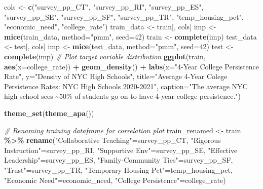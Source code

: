 \documentclass[
  man]{apa6}
\newenvironment{Shaded}{\begin{snugshade}}{\end{snugshade}}
\newcommand{\AttributeTok}[1]{\textcolor[rgb]{0.13,0.29,0.53}{#1}}
\newcommand{\CommentTok}[1]{\textcolor[rgb]{0.56,0.35,0.01}{\textit{#1}}}
\newcommand{\DecValTok}[1]{\textcolor[rgb]{0.00,0.00,0.81}{#1}}
\newcommand{\FunctionTok}[1]{\textcolor[rgb]{0.13,0.29,0.53}{\textbf{#1}}}
\newcommand{\NormalTok}[1]{#1}
\newcommand{\OtherTok}[1]{\textcolor[rgb]{0.56,0.35,0.01}{#1}}
\newcommand{\SpecialCharTok}[1]{\textcolor[rgb]{0.81,0.36,0.00}{\textbf{#1}}}
\newcommand{\StringTok}[1]{\textcolor[rgb]{0.31,0.60,0.02}{#1}}
\begin{document}
\begin{Shaded}
\begin{Highlighting}[]
\NormalTok{cols }\OtherTok{\textless{}{-}} \FunctionTok{c}\NormalTok{(}\StringTok{"survey\_pp\_CT"}\NormalTok{, }\StringTok{"survey\_pp\_RI"}\NormalTok{,}
          \StringTok{"survey\_pp\_ES"}\NormalTok{, }\StringTok{"survey\_pp\_SE"}\NormalTok{,}
          \StringTok{"survey\_pp\_SF"}\NormalTok{, }\StringTok{"survey\_pp\_TR"}\NormalTok{,}
          \StringTok{"temp\_housing\_pct"}\NormalTok{, }\StringTok{"economic\_need"}\NormalTok{,}
          \StringTok{"college\_rate"}\NormalTok{)}
\NormalTok{train\_data }\OtherTok{\textless{}{-}}\NormalTok{ train[, cols]}
\NormalTok{imp }\OtherTok{\textless{}{-}} \FunctionTok{mice}\NormalTok{(train\_data, }\AttributeTok{method=}\StringTok{"pmm"}\NormalTok{, }\AttributeTok{seed=}\DecValTok{42}\NormalTok{)}
\NormalTok{train }\OtherTok{\textless{}{-}} \FunctionTok{complete}\NormalTok{(imp)}
\NormalTok{test\_data }\OtherTok{\textless{}{-}}\NormalTok{ test[, cols]}
\NormalTok{imp }\OtherTok{\textless{}{-}} \FunctionTok{mice}\NormalTok{(test\_data, }\AttributeTok{method=}\StringTok{"pmm"}\NormalTok{, }\AttributeTok{seed=}\DecValTok{42}\NormalTok{)}
\NormalTok{test }\OtherTok{\textless{}{-}} \FunctionTok{complete}\NormalTok{(imp)}
\CommentTok{\# Plot target variable distribution}
\FunctionTok{ggplot}\NormalTok{(train, }\FunctionTok{aes}\NormalTok{(}\AttributeTok{x=}\NormalTok{college\_rate)) }\SpecialCharTok{+} 
    \FunctionTok{geom\_density}\NormalTok{() }\SpecialCharTok{+} 
    \FunctionTok{labs}\NormalTok{(}\AttributeTok{x=}\StringTok{"4{-}Year College Persistence Rate"}\NormalTok{, }\AttributeTok{y=}\StringTok{"Density of NYC High Schools"}\NormalTok{, }\AttributeTok{title=}\StringTok{"Average 4{-}Year Colege Persistence Rates: NYC High Schools 2020{-}2021"}\NormalTok{, }\AttributeTok{caption=}\StringTok{"The average NYC high school sees \textasciitilde{}50\% of students go on to have 4{-}year college persistence."}\NormalTok{)}

\FunctionTok{theme\_set}\NormalTok{(}\FunctionTok{theme\_apa}\NormalTok{())}

\CommentTok{\# Renaming training dataframe for correlation plot}
\NormalTok{train\_renamed }\OtherTok{\textless{}{-}}\NormalTok{ train }\SpecialCharTok{\%\textgreater{}\%}
  \FunctionTok{rename}\NormalTok{(}\StringTok{"Collaborative Teaching"}\OtherTok{=}\NormalTok{survey\_pp\_CT,}
         \StringTok{"Rigorous Instruction"}\OtherTok{=}\NormalTok{survey\_pp\_RI,}
         \StringTok{"Supportive Env"}\OtherTok{=}\NormalTok{survey\_pp\_SE,}
         \StringTok{"Effective Leadership"}\OtherTok{=}\NormalTok{survey\_pp\_ES,}
         \StringTok{"Family{-}Community Ties"}\OtherTok{=}\NormalTok{survey\_pp\_SF,}
         \StringTok{"Trust"}\OtherTok{=}\NormalTok{survey\_pp\_TR,}
         \StringTok{"Temporary Housing Pct"}\OtherTok{=}\NormalTok{temp\_housing\_pct,}
         \StringTok{"Economic Need"}\OtherTok{=}\NormalTok{economic\_need,}
         \StringTok{"College Persistence"}\OtherTok{=}\NormalTok{college\_rate)}


\end{Highlighting}
\end{Shaded}
\end{document}
